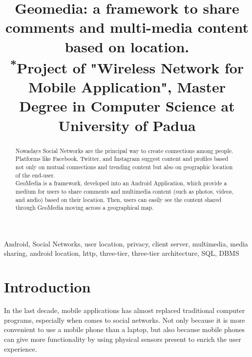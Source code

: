 \documentclass[conference]{IEEEtran}
\begin{document}
\title{Geomedia: a framework to share comments and multi-media content based on location.\\
{\footnotesize \textsuperscript{*}Project of "Wireless Network for Mobile Application", Master Degree in Computer Science at University of Padua}
}

\author{
\and
{}
}

\maketitle

\begin{abstract}
Nowadays Social Networks are the principal way to create connections among people.
Platforms like Facebook, Twitter, and Instagram suggest content and profiles based not only on mutual connections and trending content but also on geographic location of the end-user.
\\
GeoMedia is a framework, developed into an Android Application, which provide a medium for users to share comments and multimedia content (such as photos, videos, and audio) based on their location.
Then, users can easily see the content shared through GeoMedia moving across a geographical map.
\end{abstract}

\begin{IEEEkeywords}
Android, Social Networks, user location, privacy, client server, multimedia, media sharing, android location, http, three-tier, three-tier architecture, SQL, DBMS
\end{IEEEkeywords}

\section{Introduction}
In the last decade, mobile applications has almost replaced traditional computer programs, especially when comes to social networks. Not only because it is more convenient to use a mobile phone than a laptop, but also because mobile phones can give more functionality by using physical sensors present to enrich the user experience.
\end{document}
